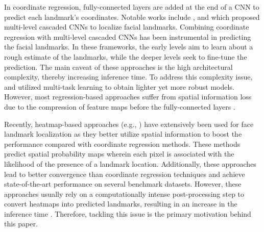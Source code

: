 \documentclass[journal]{IEEEtran}
\begin{document}
In coordinate regression, fully-connected layers are added at the end of a CNN to predict each landmark's coordinates.  
Notable works include \cite{Sun2013, Zhou2013}, and \cite{Zhang2014} which proposed multi-level cascaded CNNs to localize facial landmarks.
Combining coordinate regression with multi-level cascaded CNNs has been instrumental in predicting the facial landmarks.
In these frameworks, the early levels aim to learn about a rough estimate of the landmarks, while the deeper levels seek to fine-tune the prediction.
The main caveat of these approaches is the high architectural complexity, thereby increasing inference time.
To address this complexity issue, \cite{ZhangLuo2016} and \cite{Ranjan2016} utilized multi-task learning to obtain lighter yet more robust models.
However, most regression-based approaches suffer from spatial information loss due to the compression of feature maps before the fully-connected layers \cite{earp2021sub}.

Recently, heatmap-based approaches (e.g., \cite{Kowalski2017, xiong2020, Mahpod2018, earp2021sub}) have extensively been used for face landmark localization as they better utilize spatial information to boost the performance compared with coordinate regression methods.
These methods predict spatial probability maps wherein each pixel is associated with the likelihood of the presence of a landmark location.
Additionally, these approaches lead to better convergence than coordinate regression techniques and achieve state-of-the-art performance on several benchmark datasets.
However, these approaches usually rely on a computationally intense post-processing step to convert heatmaps into predicted landmarks, resulting in an increase in the inference time \cite{earp2021sub}. 
Therefore, tackling this issue is the primary motivation behind this paper.
\end{document}
